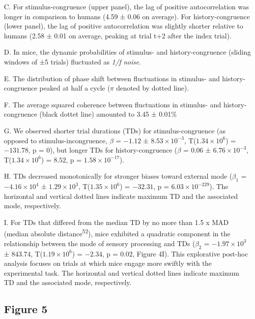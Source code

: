 \documentclass[
]{article}
\begin{document}
C. For stimulus-congruence (upper panel), the lag of positive
autocorrelation was longer in comparison to humans (4.59 ± 0.06 on
average). For history-congruence (lower panel), the lag of positive
autocorrelation was slightly shorter relative to humans (2.58 ± 0.01 on
average, peaking at trial t+2 after the index trial).

D. In mice, the dynamic probabilities of stimulus- and
history-congruence (sliding windows of ±5 trials) fluctuated as
\emph{1/f noise}.

E. The distribution of phase shift between fluctuations in stimulus- and
history-congruence peaked at half a cycle (\(\pi\) denoted by dotted
line).

F. The average squared coherence between fluctuations in stimulus- and
history-congruence (black dottet line) amounted to 3.45 ± 0.01\%

G. We observed shorter trial durations (TDs) for stimulus-congruence (as
opposed to stimulus-incongruence, \(\beta\) = \(-1.12\) ±
\(\ensuremath{8.53\times 10^{-3}}\),
T(\(\ensuremath{1.34\times 10^{6}}\)) = \(-131.78\), p = \(0\)), but
longer TDs for history-congruence (\(\beta\) = \(0.06\) ±
\(\ensuremath{6.76\times 10^{-3}}\),
T(\(\ensuremath{1.34\times 10^{6}}\)) = \(8.52\), p =
\(\ensuremath{1.58\times 10^{-17}}\)).

H. TDs decreased monotonically for stronger biases toward external mode
(\(\beta_1\) = \(\ensuremath{-4.16\times 10^{4}}\) ±
\(\ensuremath{1.29\times 10^{3}}\),
T(\(\ensuremath{1.35\times 10^{6}}\)) = \(-32.31\), p =
\(\ensuremath{6.03\times 10^{-229}}\)). The horizontal and vertical
dotted lines indicate maximum TD and the associated mode, respectively.

I. For TDs that differed from the median TD by no more than 1.5 x MAD
(median absolute distance\textsuperscript{52}), mice exhibited a
quadratic component in the relationship between the mode of sensory
processing and TDs (\(\beta_2\) = \(\ensuremath{-1.97\times 10^{3}}\) ±
\(843.74\), T(\(\ensuremath{1.19\times 10^{6}}\)) = \(-2.34\), p =
\(0.02\), Figure 4I). This explorative post-hoc analysis focuses on
trials at which mice engage more swiftly with the experimental task. The
horizontal and vertical dotted lines indicate maximum TD and the
associated mode, respectively.

\newpage

\hypertarget{figure-5}{%
\subsection{Figure 5}\label{figure-5}}
\end{document}
